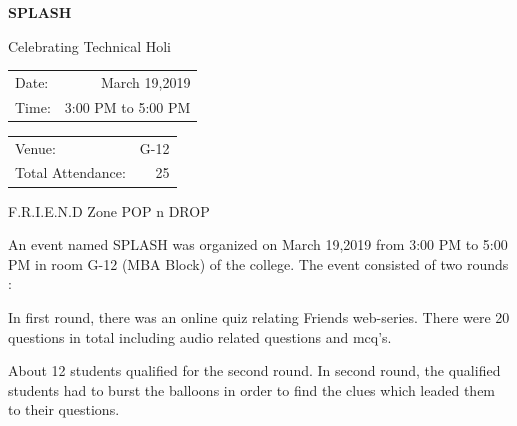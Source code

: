 \documentclass[12pt, a4 paper]{article}
\begin{document}
\begin{center}
\Huge \bfseries \ttfamily SPLASH
\end{center}

\begin{center}
\large Celebrating Technical Holi
\end{center}

\begin{center}
\begin{multicols}{2}
\begin{tabular}{l r}
Date: & March 19,2019\\ %
Time: & 3:00 PM to 5:00 PM \\ %
\end{tabular}
\columnbreak
\begin{tabular}{l r}
Venue: & G-12 \\ %
Total Attendance: & 25 \\ %
\end{tabular}
\end{multicols}


\begin{LARGE}
F.R.I.E.N.D Zone 		POP n DROP
\end{LARGE}

\begin{Large}
\begin{multicols}{2}
An event named SPLASH was organized on March 19,2019 from 3:00 PM to 5:00 PM in room G-12 (MBA Block) of the college. The event consisted of two rounds :
\columnbreak
\end{multicols}

\begin{multicols}{2}


\columnbreak
In first round, there was an online quiz relating Friends web-series. There were 20 questions in total including audio related questions and mcq’s. 
\end{multicols}

\newpage 


\begin{multicols}{2}
About 12 students qualified for the second round. In second round, the qualified students had to burst the balloons in order to find the clues which leaded them to their questions. 
\columnbreak
  

\end{multicols}
\end{Large}
\end{center}
\end{document}
